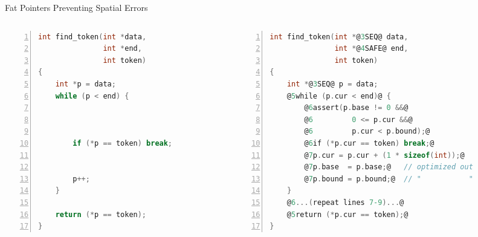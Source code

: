 \documentclass[aspectratio=169]{beamer}
\begin{document}
\begin{frame}[fragile]{Fat Pointers Preventing Spatial Errors}
    \begin{columns}[T]
      \begin{column}{0.42\textwidth}
\begin{lstlisting}[language=C,numbers=left,mathescape,basicstyle={\scriptsize\ttfamily}]
int find_token(int *data,
               int *end,
               int token)
{
    int *p = data;
    while (p < end) {



        if (*p == token) break;


        p++;
    }

    return (*p == token);
}
\end{lstlisting}
\end{column}

\pause

\begin{column}{0.56\textwidth}

\begin{lstlisting}[language=C,numbers=left,mathescape,basicstyle={\scriptsize\ttfamily},
    moredelim={**[is][\btHL<3>]{@3}{@}},
    moredelim={**[is][{\btHL<4>}]{@4}{@}},
    moredelim={**[is][{\btHL<5>}]{@5}{@}},
    moredelim={**[is][{\btHL<6>}]{@6}{@}},
    moredelim={**[is][{\btHL<7>}]{@7}{@}},
    moredelim={**[is][{\btHL<8>}]{@8}{@}}
]
int find_token(int *@3SEQ@ data,
               int *@4SAFE@ end,
               int token)
{
    int *@3SEQ@ p = data;
    @5while (p.cur < end)@ {
        @6assert(p.base != 0 &&@
        @6         0 <= p.cur &&@
        @6         p.cur < p.bound);@
        @6if (*p.cur == token) break;@
        @7p.cur = p.cur + (1 * sizeof(int));@
        @7p.base  = p.base;@   // optimized out
        @7p.bound = p.bound;@  // "           "
    }
    @6...(repeat lines 7-9)...@
    @5return (*p.cur == token);@
}
\end{lstlisting}
\end{column}

\end{columns}
\end{frame}
\end{document}
